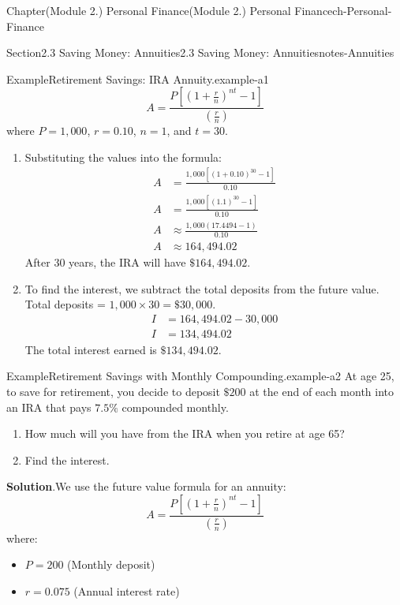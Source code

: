 \documentclass[oneside,10pt,]{book}
\newcommand{\blocktitlefont}{\relax}
\newcommand{\ptxlistdisc}{\raisebox{0.3ex}{\textbullet}}
\newcommand{\amp}{&}
\begin{document}
\begin{chapterptx}{Chapter}{(Module 2.) Personal Finance}{}{(Module 2.) Personal Finance}{}{}{ch-Personal-Finance}
\begin{sectionptx}{Section}{2.3 Saving Money: Annuities}{}{2.3 Saving Money: Annuities}{}{}{notes-Annuities}
\begin{example}{Example}{Retirement Savings: IRA Annuity.}{example-a1}
\begin{equation*}
A = \frac{P\left[\left(1+\frac{r}{n}\right)^{nt}-1\right]}{\left(\frac{r}{n}\right)}
\end{equation*}
where \(P = 1,000\), \(r = 0.10\), \(n = 1\), and \(t = 30\).%
\par
%
\begin{enumerate}[label={\arabic*}]
\item{}Substituting the values into the formula:%
\begin{align*}
A \amp = \frac{1,000\left[(1 + 0.10)^{30} - 1\right]}{0.10}\\
A \amp = \frac{1,000\left[(1.1)^{30} - 1\right]}{0.10}\\
A \amp \approx \frac{1,000(17.4494 - 1)}{0.10}\\
A \amp \approx 164,494.02
\end{align*}
After 30 years, the IRA will have \(\$164,494.02\).%
\item{}To find the interest, we subtract the total deposits from the future value. Total deposits = \(1,000 \times 30 = \$30,000\).%
\begin{align*}
I \amp = 164,494.02 - 30,000\\
I \amp = 134,494.02
\end{align*}
The total interest earned is \(\$134,494.02\).%
\end{enumerate}
%
\end{example}
\begin{example}{Example}{Retirement Savings with Monthly Compounding.}{example-a2}%
At age 25, to save for retirement, you decide to deposit \(\$200\) at the end of each month into an IRA that pays \(7.5\%\) compounded monthly.%
\begin{enumerate}[label={\arabic*}]
\item{}How much will you have from the IRA when you retire at age 65?%
\item{}Find the interest.%
\end{enumerate}
%
\par\smallskip%
\noindent\textbf{\blocktitlefont Solution}.\hypertarget{example-a2-3}{}\quad{}We use the future value formula for an annuity:%
\begin{equation*}
A = \frac{P\left[\left(1+\frac{r}{n}\right)^{nt}-1\right]}{\left(\frac{r}{n}\right)}
\end{equation*}
where:%
\begin{itemize}[label=\ptxlistdisc]
\item{}\(P = 200\) (Monthly deposit)%
\item{}\(r = 0.075\) (Annual interest rate)%

\end{itemize}
\end{example}
\end{sectionptx}
\end{chapterptx}
\end{document}
